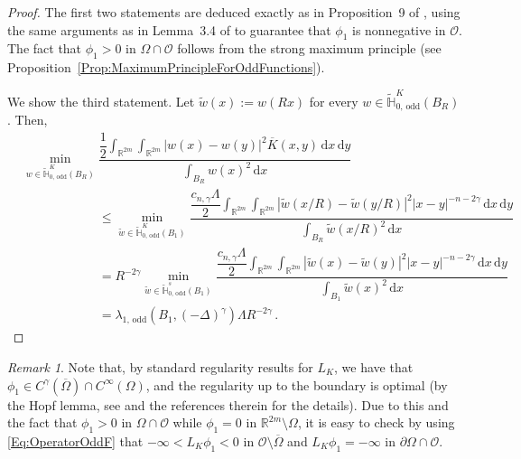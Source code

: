 \documentclass[12pt,reqno]{amsart}
\theoremstyle{definition}
\theoremstyle{remark}
\newtheorem{remark}[theorem]{Remark}
\newcommand{\con}[1]{\mathbb{#1}}
\newcommand{\R}{\con{R}} %
\renewcommand{\H}{\con{H}}
\newcommand{\ocal}{\mathcal{O}}
\newcommand{\s}{\gamma}
\newcommand{\fraclaplacian}{(-\Delta)^\s}
\renewcommand{\d}{\,\mathrm{d}} %
\def\ds{\displaystyle}
\numberwithin{equation}{section}
\begin{document}
\begin{proof}
	The first two statements are deduced exactly as in Proposition~9 of \cite{ServadeiValdinoci}, using the same arguments as in  Lemma~3.4 of \cite{FelipeSanz-Perela:IntegroDifferentialI} to guarantee that $\phi_1$ is nonnegative in $\ocal$. The fact that $\phi_1 > 0$ in $\Omega \cap \ocal$ follows from the strong maximum principle (see Proposition~\ref{Prop:MaximumPrincipleForOddFunctions}).
	
	We show the third statement. Let $\widetilde{w} (x):= w(Rx)$ for every $w\in \widetilde{\H}^K_{0, \, \mathrm{odd}}(B_R)$. Then,
	\begin{align*}
	& \min_{w \in \widetilde{\H}^K_{0, \, \mathrm{odd}}(B_R)} \dfrac{\dfrac{1}{2}  \ds\int_{\R^{2m}} \int_{\R^{2m}} |w(x) - w(y)|^2 \overline{K}(x,y) \d x \d y}{ \ds \int_{B_R} w(x)^2 \d x} \quad \quad \quad \quad \quad \quad \quad \quad \quad \quad \quad \quad\\
	&   \quad \quad \quad \quad \quad \quad \leq \min_{\widetilde{w} \in \widetilde{\H}^K_{0, \, \mathrm{odd}}(B_1)} \dfrac{\dfrac{c_{n, \s}\Lambda}{2}  \ds\int_{\R^{2m}} \int_{\R^{2m}} |\widetilde{w}(x/R) - \widetilde{w}(y/R)|^2 |x - y|^{-n-2 \s}\d x \d y}{ \ds \int_{B_R} \widetilde{w}(x/R)^2 \d x}
	\\
	& \quad \quad \quad \quad \quad \quad = R^{-2 \s }\min_{\widetilde{w} \in \widetilde{\H}^s_{0, \, \mathrm{odd}}(B_1)} \dfrac{\dfrac{c_{n, \s}\Lambda}{2}  \ds\int_{\R^{2m}} \int_{\R^{2m}} |\widetilde{w}(x) - \widetilde{w}(y)|^2 |x - y|^{-n-2 \s}\d x \d y}{ \ds \int_{B_1} \widetilde{w}(x)^2 \d x}
	\\
	& \quad \quad \quad \quad \quad \quad = \lambda_{1, \, \mathrm{odd}}(B_1, \fraclaplacian) \Lambda R^{-2 \s } \,.
	\end{align*}
\end{proof}

\begin{remark}
	\label{Remark:CsRegularityFirstEigenfunction}
	Note that, by standard regularity results for $L_K$, we have that $\phi_1 \in C^\s(\overline{\Omega})\cap C^\infty(\Omega)$, and the regularity up to the boundary is optimal (by the Hopf lemma, see \cite{RosOton-Survey} and the references therein for the details). Due to this and the fact that $\phi_1 >0$ in $\Omega\cap \ocal$ while $\phi_1=0$ in $\R^{2m}\setminus \Omega$, it is easy to check by using \eqref{Eq:OperatorOddF} that $-\infty <L_K \phi_1 < 0$ in $\ocal\setminus \overline{\Omega}$ and $L_K \phi_1 = -\infty$ in $\partial \Omega \cap \ocal$.
\end{remark}
\end{document}
